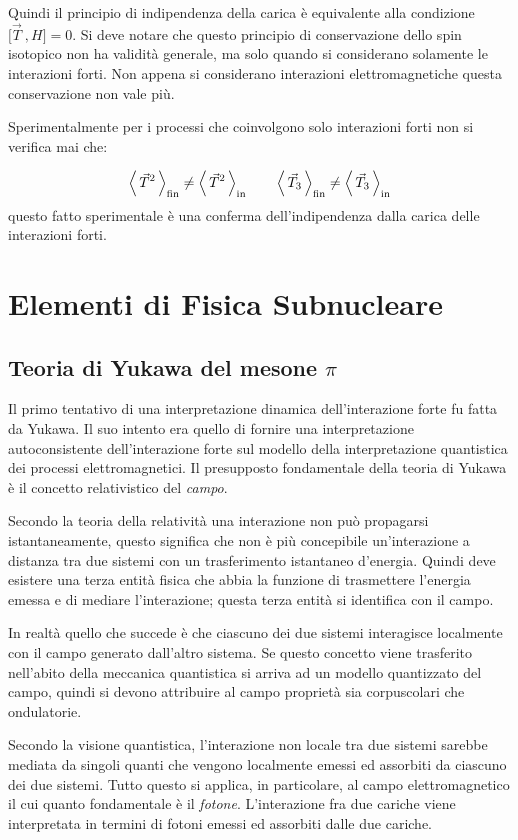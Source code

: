 Quindi il principio di indipendenza della carica è equivalente alla condizione 
$\bigl[\vec{T} \ , H \bigr] = 0$. Si deve notare che questo principio di 
conservazione dello spin isotopico non ha validità generale, ma solo quando si 
considerano solamente le interazioni forti. Non appena si considerano 
interazioni elettromagnetiche questa conservazione non vale più.

Sperimentalmente per i processi che coinvolgono solo interazioni forti non si 
verifica mai che:

\begin{equation*}
  \left\langle\, \vec{T}^2 \,\right\rangle_\text{fin} \ne \left\langle\, \vec{T}^2 \,\right\rangle_\text{in} \qquad
  \left\langle\, \vec{T}_3 \,\right\rangle_\text{fin} \ne \left\langle\, \vec{T}_3 \,\right\rangle_\text{in}
\end{equation*}
questo fatto sperimentale è una conferma dell'indipendenza dalla carica delle 
interazioni forti.

\part{Elementi di Fisica Subnucleare}
\chapter{Teoria di Yukawa del mesone $\pi$}

Il primo tentativo di una interpretazione dinamica dell'interazione forte fu
fatta da Yukawa. Il suo intento era quello di fornire una interpretazione
autoconsistente dell'interazione forte sul modello della interpretazione
quantistica dei processi elettromagnetici. Il presupposto fondamentale della
teoria di Yukawa è il concetto relativistico del \textit{campo}.

Secondo la teoria della relatività una interazione non può propagarsi
istantaneamente, questo significa che non è più concepibile un'interazione a
distanza tra due sistemi con un trasferimento istantaneo d'energia. Quindi deve
esistere una terza entità fisica che abbia la funzione di trasmettere l'energia
emessa e di mediare l'interazione; questa terza entità si identifica con il
campo.

In realtà quello che succede è che ciascuno dei due sistemi interagisce
localmente con il campo generato dall'altro sistema. Se questo concetto viene
trasferito nell'abito della meccanica quantistica si arriva ad un modello
quantizzato del campo, quindi si devono attribuire al campo proprietà sia
corpuscolari che ondulatorie.

Secondo la visione quantistica, l'interazione non locale tra due sistemi sarebbe
mediata da singoli quanti che vengono localmente emessi ed assorbiti da ciascuno
dei due sistemi. Tutto questo si applica, in particolare, al campo
elettromagnetico il cui quanto fondamentale è il \textit{fotone}. L'interazione
fra due cariche viene interpretata in termini di fotoni emessi ed assorbiti
dalle due cariche.

